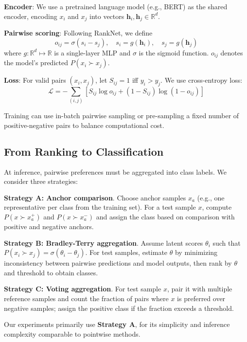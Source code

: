 \documentclass[11pt, a4paper]{article}
\begin{document}
\textbf{Encoder}: We use a pretrained language model (e.g., BERT) as the shared encoder, encoding $x_i$ and $x_j$ into vectors $\mathbf{h}_i, \mathbf{h}_j \in \mathbb{R}^d$.

\textbf{Pairwise scoring}: Following RankNet, we define
\begin{equation}
o_{ij} = \sigma(s_i - s_j), \quad s_i = g(\mathbf{h}_i), \quad s_j = g(\mathbf{h}_j)
\end{equation}
where $g: \mathbb{R}^d \mapsto \mathbb{R}$ is a single-layer MLP and $\sigma$ is the sigmoid function. $o_{ij}$ denotes the model's predicted $P(x_i \succ x_j)$.

\textbf{Loss}: For valid pairs $(x_i, x_j)$, let $S_{ij} = 1$ iff $y_i > y_j$. We use cross-entropy loss:
\begin{equation}
\mathcal{L} = -\sum_{(i,j)} \left[ S_{ij} \log o_{ij} + (1 - S_{ij}) \log (1 - o_{ij}) \right]
\end{equation}

Training can use in-batch pairwise sampling or pre-sampling a fixed number of positive-negative pairs to balance computational cost.

\subsection{From Ranking to Classification}

At inference, pairwise preferences must be aggregated into class labels. We consider three strategies:

\textbf{Strategy A: Anchor comparison}. Choose anchor samples $x_a$ (e.g., one representative per class from the training set). For a test sample $x$, compute $P(x \succ x_a^+)$ and $P(x \succ x_a^-)$ and assign the class based on comparison with positive and negative anchors.

\textbf{Strategy B: Bradley-Terry aggregation}. Assume latent scores $\theta_i$ such that $P(x_i \succ x_j) = \sigma(\theta_i - \theta_j)$. For test samples, estimate $\theta$ by minimizing inconsistency between pairwise predictions and model outputs, then rank by $\theta$ and threshold to obtain classes.

\textbf{Strategy C: Voting aggregation}. For test sample $x$, pair it with multiple reference samples and count the fraction of pairs where $x$ is preferred over negative samples; assign the positive class if the fraction exceeds a threshold.

Our experiments primarily use \textbf{Strategy A}, for its simplicity and inference complexity comparable to pointwise methods.
\end{document}
